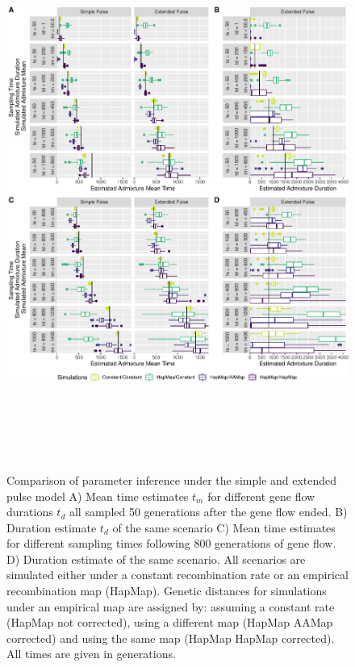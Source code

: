 \documentclass[11pt]{article}
\begin{document}
\begin{figure}
\centering
\includegraphics[width=16cm,height=18cm,keepaspectratio]{ATE_Revisions_files/figure-latex/figCloser_Sampling_Supplement-1.pdf}
\caption{\label{fig:figResult3_4_supplements} Comparison of parameter inference under the simple and extended pulse model  A) Mean time estimates $t_m$ for different gene
flow durations $t_d$ all sampled 50 generations after the gene flow ended. B)
Duration estimate $t_d$ of the same scenario C) Mean time estimates for different sampling times following 800
generations of gene flow. D) Duration estimate of the same scenario. All scenarios are simulated either under a constant recombination rate or an empirical recombination map (HapMap). Genetic distances for simulations under an empirical map are assigned by: assuming a constant rate (HapMap not corrected), using a different map (HapMap AAMap corrected) and using the same map (HapMap HapMap corrected). All times are given in generations.}
\end{figure}
\end{document}
